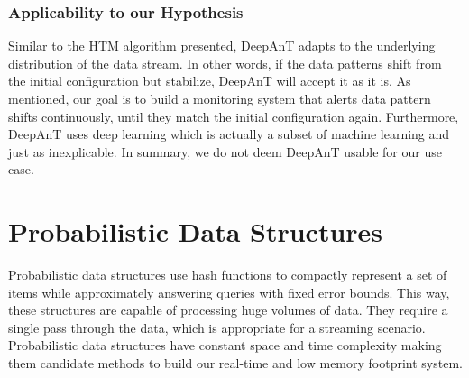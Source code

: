 \subsubsection{Applicability to our Hypothesis}

Similar to the HTM algorithm presented, DeepAnT adapts to the underlying distribution of the data stream. In other words, if the data patterns shift from the initial configuration but stabilize, DeepAnT will accept it as it is. As mentioned, our goal is to build a monitoring system that alerts data pattern shifts continuously, until they match the initial configuration again. Furthermore, DeepAnT uses deep learning which is actually a subset of machine learning and just as inexplicable. In summary, we do not deem DeepAnT usable for our use case.

\section{Probabilistic Data Structures} \label{sec:pds}
Probabilistic data structures use hash functions to compactly represent a set of items while approximately answering queries with fixed error bounds. This way, these structures are capable of processing huge volumes of data. They require a single pass through the data, which is appropriate for a streaming scenario. Probabilistic data structures have constant space and time complexity \cite{Singh-PDS-BIGD} making them candidate methods to build our real-time and low memory footprint system.

